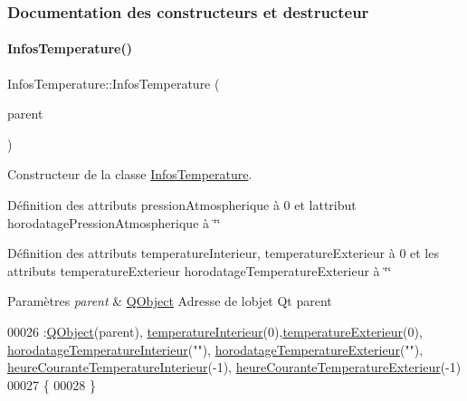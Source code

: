 \subsubsection{Documentation des constructeurs et destructeur}
\mbox{\label{class_infos_temperature_ac628607fe2ff9ca9e2d6bad741ae231a}} 
\paragraph{\texorpdfstring{Infos\+Temperature()}{InfosTemperature()}}
{\footnotesize\ttfamily Infos\+Temperature\+::\+Infos\+Temperature (\begin{DoxyParamCaption}\item[{\hyperlink{class_q_object}{Q\+Object} $\ast$}]{parent }\end{DoxyParamCaption})}

Constructeur de la classe \hyperlink{class_infos_temperature}{Infos\+Temperature}.

Définition des attributs pression\+Atmospherique à 0 et l\textquotesingle{}attribut horodatage\+Pression\+Atmospherique à \char`\"{}\char`\"{}

Définition des attributs temperature\+Interieur, temperature\+Exterieur à 0 et les attributs temperature\+Exterieur horodatage\+Temperature\+Exterieur à \char`\"{}\char`\"{}


\begin{DoxyParams}{Paramètres}
{\em parent} & \hyperlink{class_q_object}{Q\+Object} Adresse de l\textquotesingle{}objet Qt parent \\
\hline
\end{DoxyParams}

\begin{DoxyCode}
00026                                                  :\hyperlink{class_q_object}{QObject}(parent),
      \hyperlink{class_infos_temperature_a976ab7ead7ac82b5b8572807d778689e}{temperatureInterieur}(0),\hyperlink{class_infos_temperature_af80286a5b0e05d0379f53c0ebbc7d483}{temperatureExterieur}(0),
      \hyperlink{class_infos_temperature_ad4c62d479b8897102a59025a56d7b4c6}{horodatageTemperatureInterieur}(\textcolor{stringliteral}{""}),
      \hyperlink{class_infos_temperature_a5c3cd364746dc1cae5f9faee55c7555e}{horodatageTemperatureExterieur}(\textcolor{stringliteral}{""}),
      \hyperlink{class_infos_temperature_a708b70383d309fa0ba355dcc3921cc23}{heureCouranteTemperatureInterieur}(-1),
      \hyperlink{class_infos_temperature_a44edcf244175896e28798f252900f774}{heureCouranteTemperatureExterieur}(-1)
00027 \{
00028 \}
\end{DoxyCode}
\mbox{\label{class_infos_temperature_a86503a69e48f1919edbb02a434d2b124}} 
